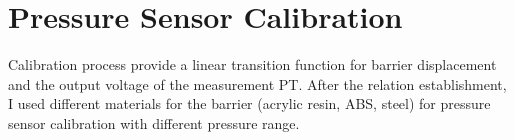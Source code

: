\section{Pressure Sensor Calibration}
\label{section:calibration_pressure}
Calibration process provide a linear transition function for barrier displacement and the output voltage of the measurement PT.
After the relation establishment, I used different materials for the barrier (acrylic resin, ABS, steel) for pressure sensor calibration with different pressure range.

